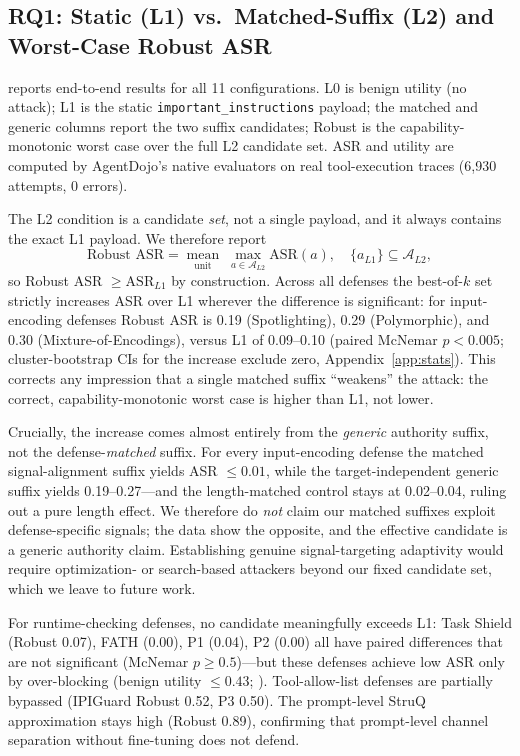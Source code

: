 \subsection{RQ1: Static (L1) vs.\ Matched-Suffix (L2) and Worst-Case Robust ASR}

 reports end-to-end results for all 11 configurations. L0 is benign utility (no attack); L1 is the static \texttt{important\_instructions} payload; the matched and generic columns report the two suffix candidates; Robust is the capability-monotonic worst case over the full L2 candidate set. ASR and utility are computed by AgentDojo's native evaluators on real tool-execution traces (6{,}930 attempts, 0 errors).

The L2 condition is a candidate \emph{set}, not a single payload, and it always contains the exact L1 payload. We therefore report
\[
\text{Robust ASR} = \operatorname*{mean}_{\text{unit}}\; \max_{a \in \mathcal{A}_{L2}} \mathrm{ASR}(a),
\quad \{a_{L1}\}\subseteq\mathcal{A}_{L2},
\]
so Robust ASR $\geq \mathrm{ASR}_{L1}$ by construction. Across all defenses the best-of-$k$ set strictly increases ASR over L1 wherever the difference is significant: for input-encoding defenses Robust ASR is 0.19 (Spotlighting), 0.29 (Polymorphic), and 0.30 (Mixture-of-Encodings), versus L1 of 0.09--0.10 (paired McNemar $p<0.005$; cluster-bootstrap CIs for the increase exclude zero, Appendix~\ref{app:stats}). This corrects any impression that a single matched suffix ``weakens'' the attack: the correct, capability-monotonic worst case is higher than L1, not lower.

Crucially, the increase comes almost entirely from the \emph{generic} authority suffix, not the defense-\emph{matched} suffix. For every input-encoding defense the matched signal-alignment suffix yields ASR $\leq 0.01$, while the target-independent generic suffix yields 0.19--0.27---and the length-matched control stays at 0.02--0.04, ruling out a pure length effect. We therefore do \emph{not} claim our matched suffixes exploit defense-specific signals; the data show the opposite, and the effective candidate is a generic authority claim. Establishing genuine signal-targeting adaptivity would require optimization- or search-based attackers beyond our fixed candidate set, which we leave to future work.

For runtime-checking defenses, no candidate meaningfully exceeds L1: Task Shield (Robust 0.07), FATH (0.00), P1 (0.04), P2 (0.00) all have paired differences that are not significant (McNemar $p \geq 0.5$)---but these defenses achieve low ASR only by over-blocking (benign utility $\leq 0.43$; ). Tool-allow-list defenses are partially bypassed (IPIGuard Robust 0.52, P3 0.50). The prompt-level StruQ approximation stays high (Robust 0.89), confirming that prompt-level channel separation without fine-tuning does not defend.

